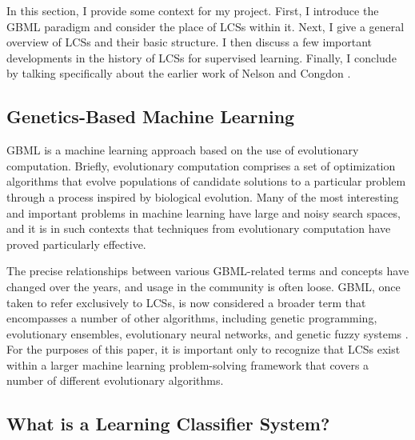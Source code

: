 \documentclass[11pt]{article}
\begin{document}
In this section, I provide some context for my project. First, I introduce the GBML paradigm and consider the place of LCSs within it. Next, I give a general overview of LCSs and their basic structure. I then discuss a few important developments in the history of LCSs for supervised learning. Finally, I conclude by talking specifically about the earlier work of Nelson and Congdon \cite{nelson_measuring_2016}.

\subsection{Genetics-Based Machine Learning}

GBML is a machine learning approach based on the use of evolutionary computation. Briefly, evolutionary computation comprises a set of optimization algorithms that evolve populations of candidate solutions to a particular problem through a process inspired by biological evolution. Many of the most interesting and important problems in machine learning have large and noisy search spaces, and it is in such contexts that techniques from evolutionary computation have proved particularly effective.

The precise relationships between various GBML-related terms and concepts have changed over the years, and usage in the community is often loose. GBML, once taken to refer exclusively to LCSs, is now considered a broader term that encompasses a number of other algorithms, including genetic programming, evolutionary ensembles, evolutionary neural networks, and genetic fuzzy systems \cite{kovacs_genetics-based_2012}. For the purposes of this paper, it is important only to recognize that LCSs exist within a larger machine learning problem-solving framework that covers a number of different evolutionary algorithms.

\subsection{What is a Learning Classifier System?}
\end{document}
